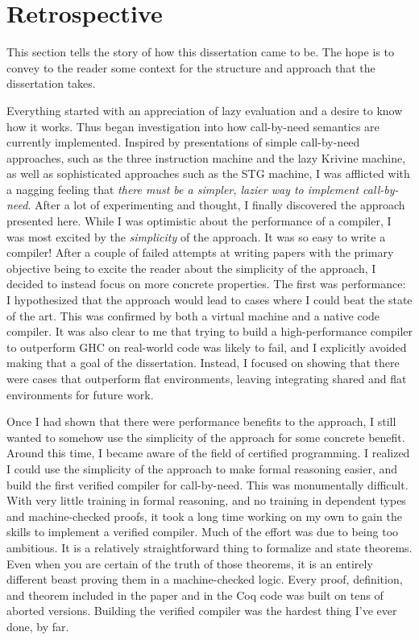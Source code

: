 \section{Retrospective}

This section tells the story of how this dissertation came to be. The hope is to
convey to the reader some context for the structure and approach that the
dissertation takes. 

Everything started with an appreciation of lazy evaluation and a desire to know
how it works. Thus began investigation into how call-by-need semantics are
currently implemented. Inspired by presentations of simple call-by-need
approaches, such as the three instruction machine and the lazy Krivine machine,
as well as sophisticated approaches such as the STG machine, I was afflicted
with a nagging feeling that \emph{there must be a simpler, lazier way to
implement call-by-need}. After a lot of experimenting and thought, I finally
discovered the approach presented here. While I was optimistic about the
performance of a compiler, I was most excited by the \emph{simplicity} of the
approach. It was so easy to write a compiler! After a couple of failed attempts
at writing papers with the primary objective being to excite the reader about
the simplicity of the approach, I decided to instead focus on more concrete
properties. The first was performance: I hypothesized that the approach would
lead to cases where I could beat the state of the art. This was confirmed by
both a virtual machine and a native code compiler. It was also clear to me
that trying to build a high-performance compiler to outperform GHC on real-world
code was likely to fail, and I explicitly avoided making that a goal of the
dissertation. Instead, I focused on showing that there were cases that
outperform flat environments, leaving integrating shared and flat environments
for future work.

Once I had shown that there were performance benefits to the approach, I still
wanted to somehow use the simplicity of the approach for some concrete benefit.
Around this time, I became aware of the field of certified programming. I
realized I could use the simplicity of the approach to make formal reasoning
easier, and build the first verified compiler for call-by-need. This was
monumentally difficult. With very little training in formal reasoning, and no
training in dependent types and machine-checked proofs, it took a long time
working on my own to gain the skills to implement a verified compiler. Much of
the effort was due to being too ambitious. It is a relatively straightforward
thing to formalize and state theorems. Even when you are certain of the truth of
those theorems, it is an entirely different beast proving them in a
machine-checked logic. Every proof, definition, and theorem included in the
paper and in the Coq code was built on tens of aborted versions. Building the
verified compiler was the hardest thing I've ever done, by far.

